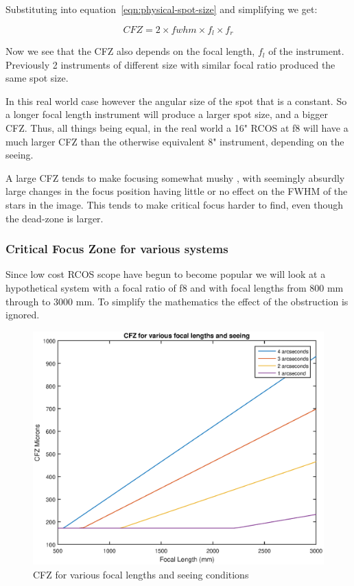 \documentclass[11pt]{article}
\begin{document}
Substituting into equation~\ref{eqn:physical-spot-size} and simplifying we get:

\begin{equation}
CFZ=2\times fwhm \times f_{l} \times f_{r}
\end{equation}

Now we see that the CFZ also depends on the focal length, $f_{l}$ of the instrument.  Previously 2 instruments of different size with similar focal ratio produced the same spot size.  

In this real world case however the angular size of the spot that is a constant.  So a longer focal length instrument will produce a larger spot size, and a bigger CFZ.  Thus, all things being equal, in the real world a 16" RCOS at f8 will have a much larger CFZ than the otherwise equivalent 8" instrument, depending on the seeing.

A large CFZ tends to make focusing somewhat mushy , with seemingly absurdly large changes in the focus position having little or no effect on the FWHM of the stars in the image.  This tends to make critical focus harder to find, even though the dead-zone is larger.  

\subsubsection{Critical Focus Zone for various systems}

Since low cost RCOS scope have begun to become popular we will look at a hypothetical system with a focal ratio of f8 and with focal lengths from 800 mm through to 3000 mm. To simplify the mathematics the effect of the obstruction is ignored.


\begin{figure}[htb]
	\begin{center}
		\includegraphics[scale=0.9]{./images/cfz-seeing.eps}
		\caption{CFZ for various focal lengths and seeing conditions}
		\label{fig:cfz-seeing}
	\end{center}
\end{figure}
\end{document}
